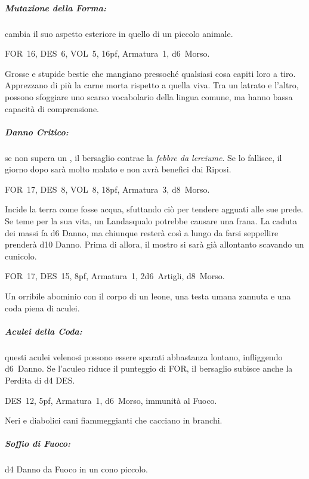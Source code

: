 \documentclass[itdr]{subfiles}
\begin{document}
\subparagraph{Mutazione della Forma:} cambia il suo aspetto esteriore in quello di un piccolo animale.

\vfill

\begin{center}
\end{center}

\vspace{-4ex}

FOR~16, DES~6, VOL~5, 16pf, Armatura~1, d6~Morso.

Grosse e stupide bestie che mangiano pressoché qualsiasi cosa capiti loro a tiro. Apprezzano di più la carne morta rispetto a quella viva. Tra un latrato e l'altro, possono sfoggiare uno scarso vocabolario della lingua comune, ma hanno bassa capacità di comprensione.

\subparagraph{Danno Critico:} se non supera un , il bersaglio contrae la {\em febbre da lerciume}. Se lo fallisce, il giorno dopo sarà molto malato e non avrà benefici dai Riposi.

\break

FOR~17, DES~8, VOL~8, 18pf, Armatura~3, d8~Morso.

Incide la terra come fosse acqua, sfuttando ciò per tendere agguati alle sue prede. Se teme per la sua vita, un Landasqualo potrebbe causare una frana. La caduta dei massi fa d6 Danno, ma chiunque resterà così a lungo da farsi seppellire prenderà d10 Danno. Prima di allora, il mostro si sarà già allontanto scavando un cunicolo.

\vfill

FOR~17, DES~15, 8pf, Armatura~1, 2d6~Artigli, d8~Morso.

Un orribile abominio con il corpo di un leone, una testa umana zannuta e una coda piena di aculei.

\subparagraph{Aculei della Coda:} questi aculei velenosi possono essere sparati abbastanza lontano, infliggendo d6~Danno. Se l'aculeo riduce il punteggio di FOR, il bersaglio subisce anche la Perdita di d4 DES.

\vfill

DES~12, 5pf, Armatura~1, d6~Morso, immunità al Fuoco.

Neri e diabolici cani fiammeggianti che cacciano in branchi.

\subparagraph{Soffio di Fuoco:} d4 Danno da Fuoco in un cono piccolo.
\end{document}
